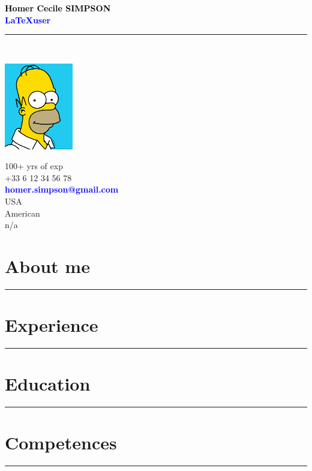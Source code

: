 \documentclass[11pt,A4]{article}
\begin{document}
\noindent\textcolor{black}{\large \bf Homer Cecile SIMPSON}\\
\textcolor{blue}{\large \bf \LaTeX \hspace{2mm}user }\vspace{5pt}\\
\noindent\textcolor{black}{\rule{\textwidth}{.8mm}}\\

\begin{minipage}[c]{0.3\textwidth}
\includegraphics[width=30mm]{photo}
\end{minipage}
\begin{minipage}[c]{0.35\textwidth}
\MineSign \hfill 100+ yrs of exp\\
\faPhone \hfill +33 6 12 34 56 78\\
\Letter \hfill \textcolor{blue}{\bf homer.simpson@gmail.com}\\
\faHome \hfill USA\\
\faFlag \hfill American\\
\faCar \hfill n/a\\
\end{minipage}

\section*{\hspace{0.5cm}About me}
\noindent\textcolor{black}{\rule{\textwidth}{.8mm}}
\lipsum[1]

\section*{\hspace{0.5cm}Experience}
\noindent\textcolor{black}{\rule{\textwidth}{.8mm}}
\lipsum[2]

\section*{\hspace{0.5cm}Education}
\noindent\textcolor{black}{\rule{\textwidth}{.8mm}}
\lipsum[3]

\section*{\hspace{0.5cm}Competences}
\noindent\textcolor{black}{\rule{\textwidth}{.8mm}}
\lipsum[4]
\end{document}
